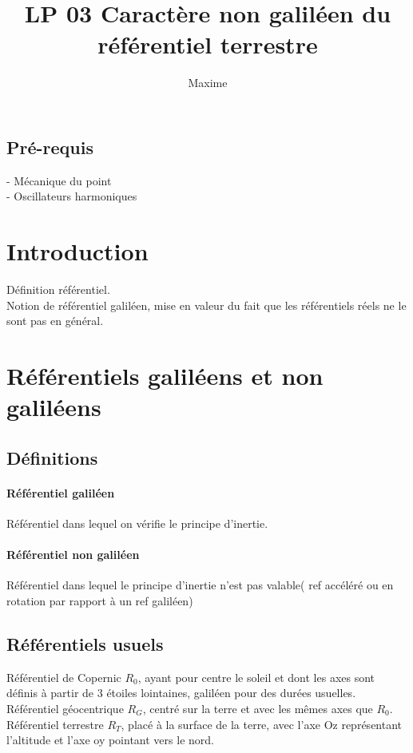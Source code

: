 \documentclass[12pt,prb,aps,epsf]{report}
\begin{document}
	
	\title{LP 03 Caractère non galiléen du référentiel terrestre}
	\author{Maxime}
	
	\maketitle
	
	\tableofcontents
	
	\pagebreak
	
	
\subsection*{Pré-requis}
- Mécanique du point \\
- Oscillateurs harmoniques
	
\section{Introduction}
Définition référentiel. \\
Notion de référentiel galiléen, mise en valeur du fait que les référentiels réels ne le sont pas en général.
\section{Référentiels galiléens et non galiléens}
\subsection{Définitions}
\paragraph{Référentiel galiléen}
Référentiel dans lequel on vérifie le principe d'inertie.
\paragraph{Référentiel non galiléen}
Référentiel dans lequel le principe d'inertie n'est pas valable( ref accéléré ou en rotation par rapport à un ref galiléen)

\subsection{Référentiels usuels}
Référentiel de Copernic $R_0$, ayant pour centre le soleil et dont les axes sont définis à partir de 3 étoiles lointaines, galiléen pour des durées usuelles.\\
Référentiel géocentrique $R_G$, centré sur la terre et avec les mêmes axes que $R_0$.\\
Référentiel terrestre $R_T$, placé à la surface de la terre, avec l'axe Oz représentant l'altitude et l'axe oy pointant vers le nord.
\end{document}
